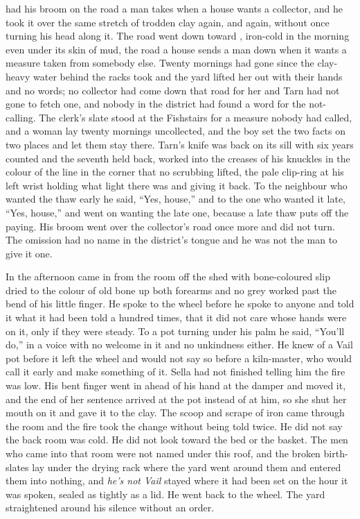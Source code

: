  had his broom on the road a man takes when a house wants a collector, and he took it over the same stretch of trodden clay again, and again, without once turning his head along it. The road went down toward , iron-cold in the morning even under its skin of mud, the road a house sends a man down when it wants a measure taken from somebody else. Twenty mornings had gone since the clay-heavy water behind the racks took  and the yard lifted her out with their hands and no words; no collector had come down that road for her and Tarn had not gone to fetch one, and nobody in the district had found a word for the not-calling. The clerk's slate stood at the Fishstairs for a measure nobody had called, and a woman lay twenty mornings uncollected, and the boy set the two facts on two places and let them stay there. Tarn's knife was back on its sill with six years counted and the seventh held back,  worked into the creases of his knuckles in the colour of the line in the corner that no scrubbing lifted, the pale clip-ring at his left wrist holding what light there was and giving it back. To the neighbour who wanted the thaw early he said, “Yes, house,” and to the one who wanted it late, “Yes, house,” and went on wanting the late one, because a late thaw puts off the paying. His broom went over the collector's road once more and did not turn. The omission had no name in the district's tongue and he was not the man to give it one.

In the afternoon  came in from the room off the shed with bone-coloured slip dried to the colour of old bone up both forearms and no grey worked past the bend of his little finger. He spoke to the wheel before he spoke to anyone and told it what it had been told a hundred times, that it did not care whose hands were on it, only if they were steady. To a pot turning under his palm he said, “You'll do,” in a voice with no welcome in it and no unkindness either. He knew  of a Vail pot before it left the wheel and would not say so before a kiln-master, who would call it early and make something of it. Sella had not finished telling him the fire was low. His bent finger went in ahead of his hand at the damper and moved it, and the end of her sentence arrived at the pot instead of at him, so she shut her mouth on it and gave it to the clay. The scoop and scrape of iron came through the room and the fire took the change without being told twice. He did not say the back room was cold. He did not look toward the bed or the basket. The men who came into that room were not named under this roof, and the broken birth-slates lay under the drying rack where the yard went around them and entered them into nothing, and \emph{he's not Vail} stayed where it had been set on the hour it was spoken, sealed as tightly as a lid. He went back to the wheel. The yard straightened around his silence without an order.

